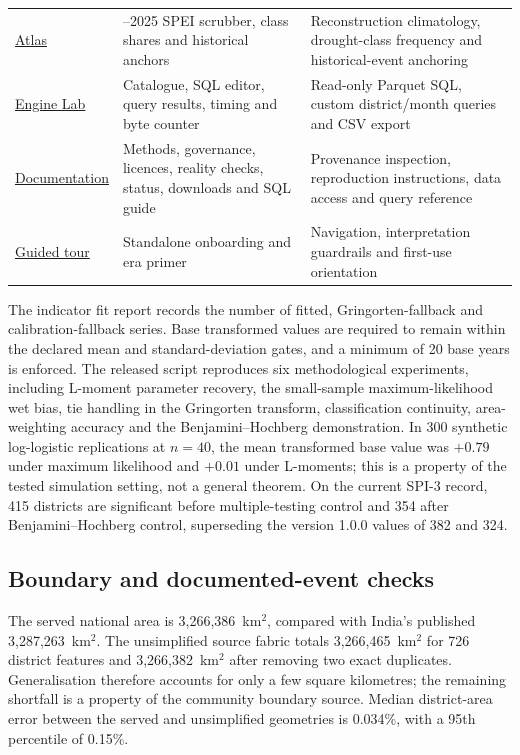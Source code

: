 \documentclass[11pt,a4paper]{article}
\begin{document}
\begin{table}[t]
\begin{tabularx}{\textwidth}{@{}>{\RaggedRight\arraybackslash}p{}>{\RaggedRight\arraybackslash}p{}>{\RaggedRight\arraybackslash}X@{}}
\href{https://drought.ankitdeshmukh.com/\#atlas}{Atlas} & 1901--2025 SPEI scrubber, class shares and historical anchors & Reconstruction climatology, drought-class frequency and historical-event anchoring \\
\href{https://drought.ankitdeshmukh.com/\#engine}{Engine Lab} & Catalogue, SQL editor, query results, timing and byte counter & Read-only Parquet SQL, custom district/month queries and CSV export \\
\href{https://drought.ankitdeshmukh.com/\#data}{Documentation} & Methods, governance, licences, reality checks, status, downloads and SQL guide & Provenance inspection, reproduction instructions, data access and query reference \\
\href{https://drought.ankitdeshmukh.com/tour.html}{Guided tour} & Standalone onboarding and era primer & Navigation, interpretation guardrails and first-use orientation \\
\bottomrule
\end{tabularx}
\end{table}

The indicator fit report records the number of fitted, Gringorten-fallback and calibration-fallback series. Base transformed values are required to remain within the declared mean and standard-deviation gates, and a minimum of 20 base years is enforced. The released  script reproduces six methodological experiments, including L-moment parameter recovery, the small-sample maximum-likelihood wet bias, tie handling in the Gringorten transform, classification continuity, area-weighting accuracy and the Benjamini--Hochberg demonstration. In 300 synthetic log-logistic replications at $n=40$, the mean transformed base value was $+0.79$ under maximum likelihood and $+0.01$ under L-moments; this is a property of the tested simulation setting, not a general theorem. On the current SPI-3 record, 415 districts are significant before multiple-testing control and 354 after Benjamini--Hochberg control, superseding the version 1.0.0 values of 382 and 324.

\subsection*{Boundary and documented-event checks}
The served national area is 3,266,386~km$^2$, compared with India's published 3,287,263~km$^2$. The unsimplified source fabric totals 3,266,465~km$^2$ for 726 district features and 3,266,382~km$^2$ after removing two exact duplicates. Generalisation therefore accounts for only a few square kilometres; the remaining shortfall is a property of the community boundary source. Median district-area error between the served and unsimplified geometries is 0.034\%, with a 95th percentile of 0.15\%.
\end{document}
